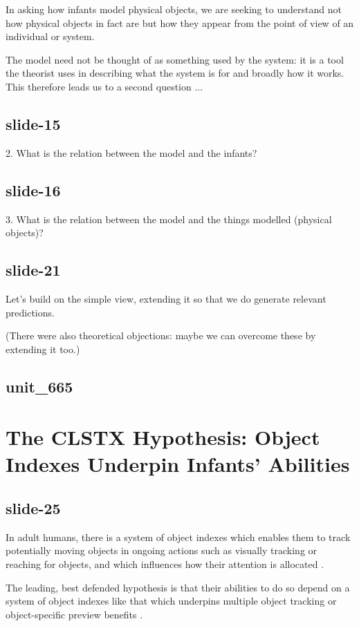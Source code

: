 \documentclass[12pt,\papersize]{extarticle}
\begin{document}
In asking how infants
model physical objects, we are seeking to understand not how physical objects
in fact are but how they appear from the point of view of
an individual or system.

The model need not be thought of as something used by the system: it is
a tool the theorist uses in describing what the system is for and
broadly how it works.
This therefore leads us to a second question ...

\subsection{slide-15}
2. What is the relation between the model and the infants?

\subsection{slide-16}
3. What is the relation between the model and the things modelled (physical objects)?

\subsection{slide-21}
Let’s build on the simple view, extending it so that we do generate
relevant predictions.

(There were also theoretical objections: maybe we can overcome these
by extending it too.)

\subsection{unit\_665}


\section{The CLSTX Hypothesis: Object Indexes Underpin Infants’ Abilities}

\subsection{slide-25}
In adult humans,
there is a system of object indexes which enables them to track
potentially moving objects in ongoing actions such as visually tracking or
reaching for objects, and which influences how their attention is allocated
\citep{flombaum:2008_attentional}.

The leading, best defended hypothesis is that their abilities to do so
depend on a system of
object indexes like that which underpins multiple object tracking or
object-specific preview benefits
\citep{Leslie:1998zk,Scholl:1999mi,Carey:2001ue,scholl:2007_objecta}.
\end{document}
